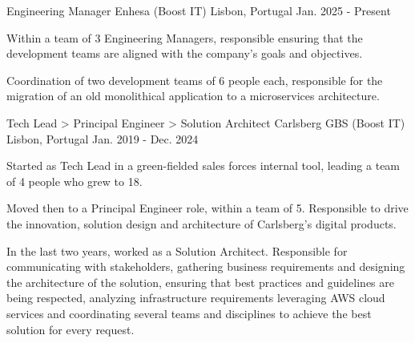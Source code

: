 

\begin{cventries}

  \cventry
    {Engineering Manager} %
    {Enhesa (Boost IT)} %
    {Lisbon, Portugal} %
    {Jan. 2025 - Present} %
    {
      \begin{cvitems} %
        \item {Within a team of 3 Engineering Managers, responsible ensuring that the development teams are aligned with the company's goals and objectives.}
        \item {Coordination of two development teams of 6 people each, responsible for the migration of an old monolithical application to a microservices architecture.}
      \end{cvitems}
    }

  \cventry
    {Tech Lead > Principal Engineer > Solution Architect} %
    {Carlsberg GBS (Boost IT)} %
    {Lisbon, Portugal} %
    {Jan. 2019 - Dec. 2024} %
    {
      \begin{cvitems} %
        \item {Started as Tech Lead in a green-fielded sales forces internal tool, leading a team of 4 people who grew to 18.}
        \item {Moved then to a Principal Engineer role, within a team of 5. Responsible to drive the innovation, solution design and architecture of Carlsberg's digital products.}
        \item {In the last two years, worked as a Solution Architect. Responsible for communicating with stakeholders, gathering business requirements and designing the architecture of the solution, ensuring that best practices and guidelines are being respected, analyzing infrastructure requirements leveraging AWS cloud services and coordinating several teams and disciplines to achieve the best solution for every request.}
      \end{cvitems}
    }


\end{cventries}

